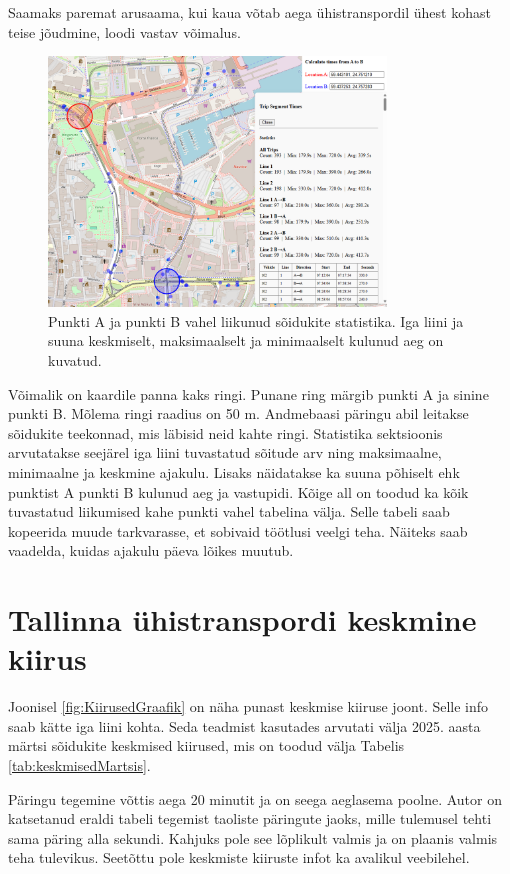 Saamaks paremat arusaama, kui kaua võtab aega ühistranspordil ühest kohast teise jõudmine, loodi vastav võimalus.

\begin{figure}[h!]
    \centering
    \includegraphics[width=0.8\textwidth]{figures/Liin1VsLiin2V2.png}
    \caption{Punkti A ja punkti B vahel liikunud sõidukite statistika. Iga liini ja suuna keskmiselt, maksimaalselt ja minimaalselt kulunud aeg on kuvatud.}
    \label{fig:Liin1VsLiin2V2}
\end{figure}

Võimalik on kaardile panna kaks ringi. Punane ring märgib punkti A ja sinine punkti B. Mõlema ringi raadius on 50 m. Andmebaasi päringu abil leitakse sõidukite teekonnad, mis läbisid neid kahte ringi. Statistika sektsioonis arvutatakse seejärel iga liini tuvastatud sõitude arv ning maksimaalne, minimaalne ja keskmine ajakulu. Lisaks näidatakse ka suuna põhiselt ehk punktist A punkti B kulunud aeg ja vastupidi. Kõige all on toodud ka kõik tuvastatud liikumised kahe punkti vahel tabelina välja. Selle tabeli saab kopeerida muude tarkvarasse, et sobivaid töötlusi veelgi teha. Näiteks saab vaadelda, kuidas ajakulu päeva lõikes muutub.


\section{Tallinna ühistranspordi keskmine kiirus}

Joonisel \ref{fig:KiirusedGraafik} on näha punast keskmise kiiruse joont. Selle info saab kätte iga liini kohta. Seda teadmist kasutades arvutati välja 2025. aasta märtsi sõidukite keskmised kiirused, mis on toodud välja Tabelis \ref{tab:keskmisedMartsis}.

Päringu tegemine võttis aega 20 minutit ja on seega aeglasema poolne. Autor on katsetanud eraldi tabeli tegemist taoliste päringute jaoks, mille tulemusel tehti sama päring alla sekundi. Kahjuks pole see lõplikult valmis ja on plaanis valmis teha tulevikus. Seetõttu pole keskmiste kiiruste infot ka avalikul veebilehel.

